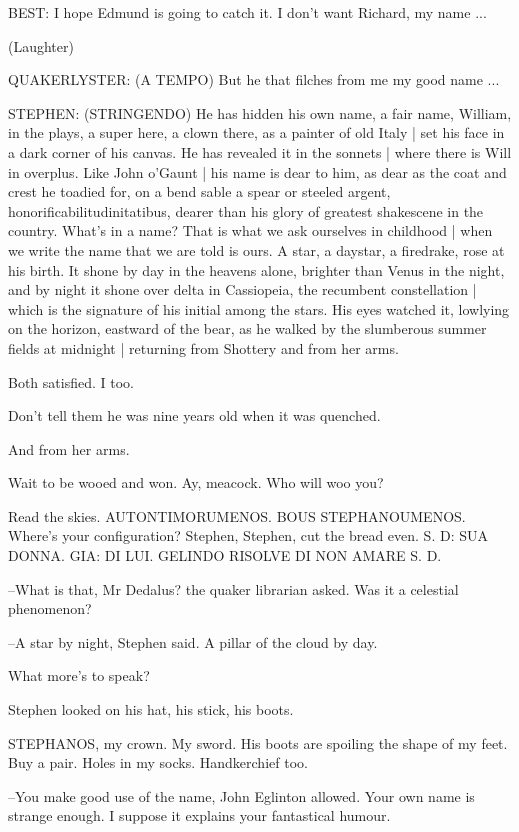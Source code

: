 BEST:
I hope Edmund is going to catch it.
I don't want Richard, my name ...

                (Laughter)

QUAKERLYSTER:
(A TEMPO)
But he that filches from me my good name ...

STEPHEN:
(STRINGENDO)
He has hidden his own name,
a fair name,
William,
in the plays,
a super here,
a clown there,
as a painter of old Italy |
set his face in a dark corner of his canvas.
He has revealed it in the sonnets |
where there is Will in overplus.
Like John o'Gaunt |
his name is dear to him,
as dear as the coat and crest he toadied for,
on a bend sable a spear or steeled argent,
honorificabilitudinitatibus,
dearer than his glory of greatest shakescene in the country.
What's in a name?
That is what we ask ourselves in childhood |
when we write the name that we are told is ours.
A star,
a daystar,
a firedrake,
rose at his birth.
It shone by day in the heavens alone,
brighter than Venus in the night,
and by night it shone over delta in Cassiopeia,
the recumbent constellation |
which is the signature of his initial among the stars.
His eyes watched it,
lowlying on the horizon,
eastward of the bear,
as he walked by the slumberous summer fields at midnight |
returning from Shottery and from her arms.

Both satisfied.
I too.

Don't tell them he was nine years old when it was quenched.

And from her arms.

Wait to be wooed and won.
Ay,
meacock.
Who will woo you?

Read the skies.
AUTONTIMORUMENOS.
BOUS STEPHANOUMENOS.
Where's your configuration?
Stephen,
Stephen,
cut the bread even.
S. D:
SUA DONNA.
GIA:
DI LUI.
GELINDO RISOLVE DI NON AMARE S. D.

--What is that,
Mr Dedalus?
the quaker librarian asked.
Was it a celestial phenomenon?

--A star by night,
Stephen said.
A pillar of the cloud by day.

What more's to speak?

Stephen looked on his hat,
his stick,
his boots.

STEPHANOS,
my crown.
My sword.
His boots are spoiling the shape of my feet.
Buy a pair.
Holes in my socks.
Handkerchief too.

--You make good use of the name,
John Eglinton allowed.
Your own name is strange enough.
I suppose it explains your fantastical humour.

